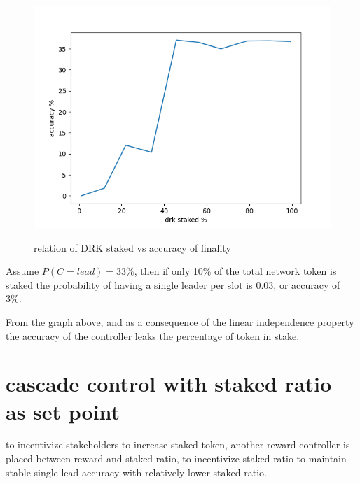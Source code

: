 \documentclass{article}
\begin{document}
\begin{description}
  \begin{figure}[!h]
    \caption {relation of DRK staked vs accuracy of finality}
    \centering
    \includegraphics{hodler_acc_vs_sr.png}
    \label{fig:relation of DRK staked vs accuracy of finality}
    \end{figure}


\item Assume $P(C=lead)=33\%$, then if only 10\% of the total network token
is staked the probability of having a single leader per slot is 0.03,
or accuracy of 3\%.


\item From the graph above, and as a consequence of the linear independence
property the accuracy of the controller leaks the percentage of token
in stake.

\end{description}

\section{cascade control with staked ratio as set point}
\begin{description}
\item to incentivize stakeholders to increase staked token, another reward controller is placed between reward and staked ratio, to incentivize staked ratio to maintain stable single lead accuracy with relatively lower staked ratio.

\end{description}
\end{document}
